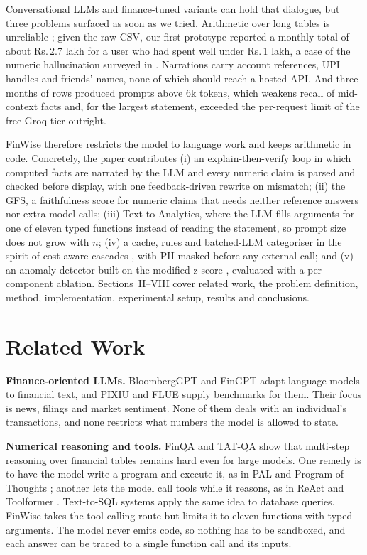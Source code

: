 \documentclass[conference]{IEEEtran}
\DeclareRobustCommand{\rupee}{Rs.\,}
\begin{document}
Conversational LLMs \cite{brown2020} and finance-tuned variants \cite{wu2023bloomberggpt,yang2023fingpt,xie2023pixiu} can hold that dialogue, but three problems surfaced as soon as we tried. Arithmetic over long tables is unreliable \cite{chen2021finqa,zhu2021tatqa}; given the raw CSV, our first prototype reported a monthly total of about \rupee 2.7 lakh for a user who had spent well under \rupee 1 lakh, a case of the numeric hallucination surveyed in \cite{ji2023survey}. Narrations carry account references, UPI handles and friends' names, none of which should reach a hosted API. And three months of rows produced prompts above 6k tokens, which weakens recall of mid-context facts \cite{liu2024lost} and, for the largest statement, exceeded the per-request limit of the free Groq tier outright.

FinWise therefore restricts the model to language work and keeps arithmetic in code. Concretely, the paper contributes (i) an explain-then-verify loop in which computed facts are narrated by the LLM and every numeric claim is parsed and checked before display, with one feedback-driven rewrite on mismatch; (ii) the GFS, a faithfulness score for numeric claims that needs neither reference answers nor extra model calls; (iii) Text-to-Analytics, where the LLM fills arguments for one of eleven typed functions instead of reading the statement, so prompt size does not grow with $n$; (iv) a cache, rules and batched-LLM categoriser in the spirit of cost-aware cascades \cite{chen2023frugal}, with PII masked before any external call; and (v) an anomaly detector built on the modified z-score \cite{iglewicz1993}, evaluated with a per-component ablation. Sections~II--VIII cover related work, the problem definition, method, implementation, experimental setup, results and conclusions.

\section{Related Work}
\textbf{Finance-oriented LLMs.} BloombergGPT \cite{wu2023bloomberggpt} and FinGPT \cite{yang2023fingpt} adapt language models to financial text, and PIXIU \cite{xie2023pixiu} and FLUE \cite{shah2022flue} supply benchmarks for them. Their focus is news, filings and market sentiment. None of them deals with an individual's transactions, and none restricts what numbers the model is allowed to state.

\textbf{Numerical reasoning and tools.} FinQA \cite{chen2021finqa} and TAT-QA \cite{zhu2021tatqa} show that multi-step reasoning over financial tables remains hard even for large models. One remedy is to have the model write a program and execute it, as in PAL \cite{gao2023pal} and Program-of-Thoughts \cite{chen2023pot}; another lets the model call tools while it reasons, as in ReAct \cite{yao2023react} and Toolformer \cite{schick2023toolformer}. Text-to-SQL systems \cite{yu2018spider,rajkumar2022sql} apply the same idea to database queries. FinWise takes the tool-calling route but limits it to eleven functions with typed arguments. The model never emits code, so nothing has to be sandboxed, and each answer can be traced to a single function call and its inputs.
\end{document}
